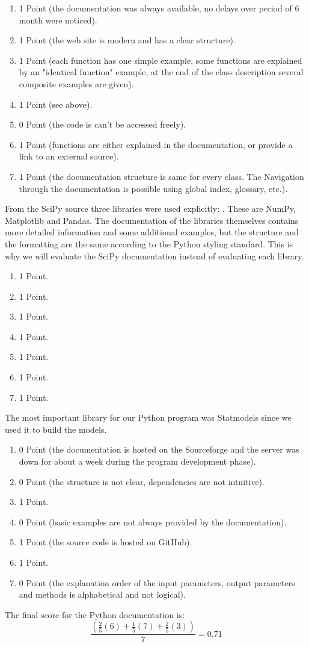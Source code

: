 \documentclass [twoside,
  11pt, a4paper,
  footinclude=true,
  headinclude=true,
  cleardoublepage=empty
]{article}
\begin{document}
\begin{enumerate}
    \item 1 Point (the documentation was always available, no delays over period of 6 month were noticed).
    \item 1 Point (the web site is modern and has a clear structure).
    \item 1 Point (each function has one simple example, some functions are explained by an "identical function" example, at the end of the class description several composite examples are given).
    \item 1 Point (see above).
    \item 0 Point (the code is can't be accessed freely).
    \item 1 Point (functions are either explained in the documentation, or provide a link to an external source).
    \item 1 Point (the documentation structure is same for every class. The Navigation through the documentation is possible using global index, glossary, etc.).
\end{enumerate}
From the SciPy source three libraries were used explicitly:
. These are NumPy, Matplotlib and Pandas. The documentation of the libraries themselves contains more detailed information and some additional examples, but the structure and the formatting are the same according to the Python styling standard. This is why we will evaluate the SciPy documentation instead of evaluating each library.
\begin{enumerate}
    \item 1 Point.
    \item 1 Point.
    \item 1 Point.
    \item 1 Point.
    \item 1 Point.
    \item 1 Point.
    \item 1 Point.
\end{enumerate}
The most important library for our Python program was Statmodels since we used it to build the models.
\begin{enumerate}
    \item 0 Point (the documentation is hosted on the Sourceforge and the server was down for about a week during the program development phase).
    \item 0 Point (the structure is not clear, dependencies are not intuitive).
    \item 1 Point.
    \item 0 Point (basic examples are not always provided by the documentation).
    \item 1 Point (the source code is hosted on GitHub).
    \item 1 Point.
    \item 0 Point (the explanation order of the input parameters, output parameters and methods is alphabetical and not logical).
\end{enumerate}
The final score for the Python documentation is:
\[ \frac{(\frac{2}{5}(6) + \frac{1}{5}(7) + \frac{2}{5}(3) )}{7}= 0.71\]
\end{document}
